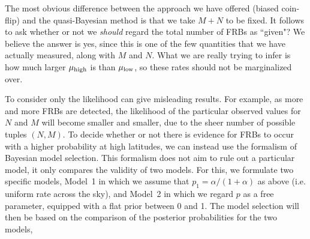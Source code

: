 \documentclass[useAMS,usenatbib]{mn2e}
\begin{document}




The most obvious difference between the approach we have offered (biased coin-flip) 
and the quasi-Bayesian method is that we take $M+N$ to be fixed. It follows to ask 
whether or not we \textit{should} regard the total number of FRBs as ``given"? 
We believe the answer is yes, since this is one of the few quantities that we 
have actually measured, along with $M$ and $N$. What we are really trying 
to infer is how much larger $\mu_{\textup{high}}$ is than $\mu_{\textup{low}}$, so these 
rates should not be marginalized over. 

To consider only the likelihood can give misleading results. 
For example, as more and more FRBs are detected, the 
likelihood of the particular observed values for $N$ and $M$ 
will become smaller and smaller, due to the sheer number of 
possible tuples $(N,M)$.
To decide whether or not there is evidence for FRBs to occur with a 
higher probability at high latitudes, we can instead use the formalism 
of Bayesian model selection. This formalism does not aim to rule out a
particular model, it only compares the validity of two models. 
For this, we formulate two specific models, Model~1 in which we
assume that $p_1=\alpha/(1+\alpha)$ as above (i.e. uniform rate across the sky), and Model~2 in 
which we regard $p$ as a free parameter, equipped with a flat prior 
between 0 and 1. The model selection will then be based on the comparison
of the posterior probabilities for the two models,
   
\end{document}
